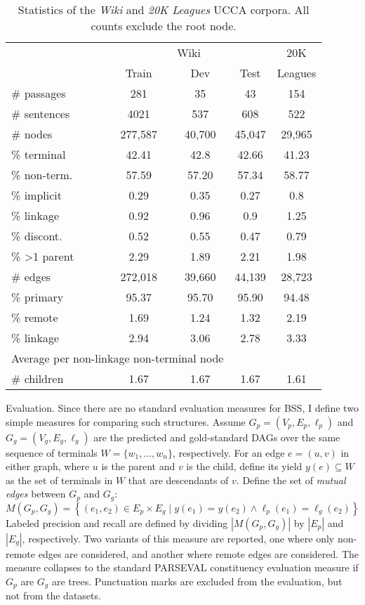\documentclass[12pt]{article}
\makeatletter
\renewcommand{\paragraph}{
  \@startsection{paragraph}{4}
  {\z@}{.3ex \@plus .3ex \@minus .2ex}{-1em}
  {\normalfont\normalsize\bfseries}
}
\makeatother
\begin{document}
\begin{table}\small
  \centering
\begin{tabular}{l|ccc|c}
& \multicolumn{3}{c|}{Wiki} & 20K \\
& \small Train & \small Dev & \small Test & Leagues \\
\hline
\# passages & 281 & 35 & 43 & 154 \\
\# sentences & 4021 & 537 & 608 & 522 \\
\hline
\# nodes & 277,587 & 40,700 & 45,047 & 29,965 \\
\% terminal & 42.41 & 42.8 & 42.66 & 41.23 \\
\% non-term. & 57.59 & 57.20 & 57.34 & 58.77 \\
\% implicit & 0.29 & 0.35 & 0.27 & 0.8 \\
\% linkage & 0.92 & 0.96 & 0.9 & 1.25 \\
\% discont. & 0.52 & 0.55 & 0.47 & 0.79 \\
\% \textgreater 1 parent & 2.29 & 1.89 & 2.21 & 1.98 \\
\hline
\# edges & 272,018 & 39,660 & 44,139 & 28,723 \\
\% primary & 95.37 & 95.70 & 95.90 & 94.48 \\
\% remote & 1.69 & 1.24 & 1.32 & 2.19 \\
\% linkage & 2.94 & 3.06 & 2.78 & 3.33 \\
\hline
\multicolumn{3}{l}{\footnotesize Average per non-linkage non-terminal node} \\
\# children & 1.67 & 1.67 & 1.67 & 1.61 
\end{tabular}
\caption{Statistics of the \textit{Wiki} and \textit{20K Leagues} UCCA corpora.
All counts exclude the root node.
}
\label{table:data}
\end{table}

\paragraph{Evaluation.}
Since there are no standard evaluation measures for BSS, I define
two simple measures for comparing such structures.
Assume $G_p=(V_p,E_p,\ell_p)$ and $G_g=(V_g,E_g,\ell_g)$
are the predicted and gold-standard DAGs over the same
sequence of terminals $W = \{w_1,\ldots,w_n\}$, respectively.
For an edge $e=(u,v)$ in either graph,
where $u$ is the parent and $v$ is the child, define its yield $y(e) \subseteq W$ as the
set of terminals in $W$ that are descendants of $v$.
Define the set of \textit{mutual edges} between $G_p$ and $G_g$:
\[
  M(G_p,G_g) =
  \left\{(e_1,e_2) \in E_p \times E_g \;|\;
  y(e_1) = y(e_2) \wedge \ell_p(e_1)=\ell_g(e_2)\right\}
\]
Labeled precision and recall are defined by dividing $|M(G_p,G_g)|$ by $|E_p|$ and $|E_g|$, respectively.
Two variants of this measure are reported, one where only non-remote edges are considered,
and another where remote edges are considered. The measure collapses to the standard
PARSEVAL constituency evaluation measure if $G_p$ are $G_g$ are trees.
Punctuation marks are excluded from the evaluation, but not from the datasets.
\end{document}
